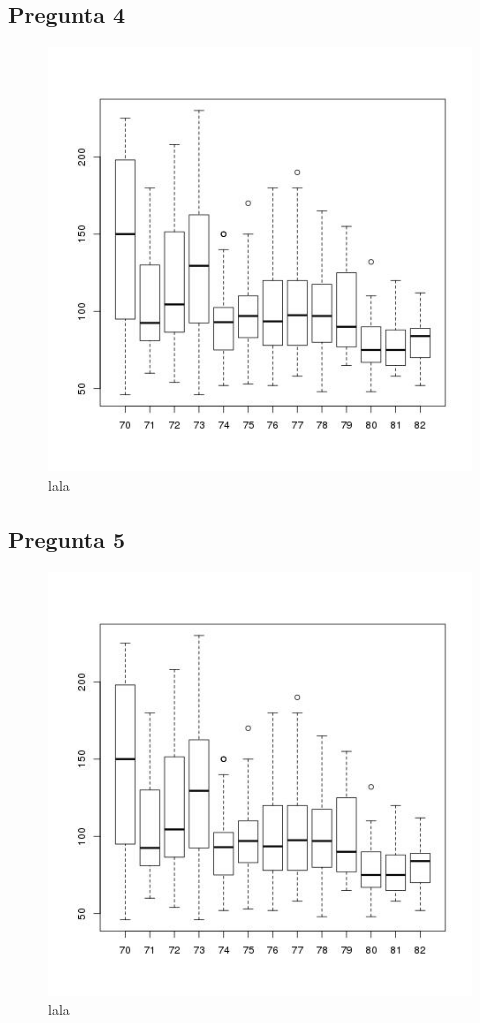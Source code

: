 \documentclass[letter,10pt]{article}
\begin{document}
\subsection{Pregunta 4}
\begin{figure}[h!]
    \centering
    \includegraphics[scale=0.5]{boxplot_horsepower_model_year.jpg}
    \caption{lala}
    \label{fig:lala}
\end{figure}
\newpage
\subsection{Pregunta 5}

\begin{figure}[h!]
    \centering
    \includegraphics[scale=0.5]{boxplot_horsepower_model_year.jpg}
    \caption{lala}
    \label{fig:lala}
\end{figure}
\end{document}
